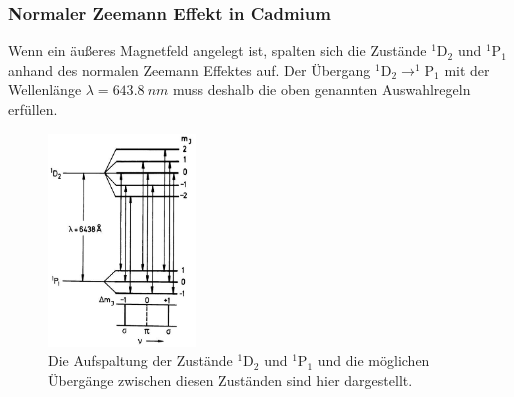         \subsubsection*{Normaler Zeemann Effekt in Cadmium}
            Wenn ein äußeres Magnetfeld angelegt ist, spalten sich die Zustände $^1\text{D}_2$ und $^1\text{P}_1$ anhand des normalen Zeemann Effektes auf.
            Der Übergang $^1\text{D}_2 \rightarrow ^1\text{P}_1$ mit der Wellenlänge $\lambda = \SI{643,8}{nm}$ muss deshalb die oben genannten Auswahlregeln erfüllen.
            \begin{figure}[h]
                \center
                \includegraphics[width=0.35\textwidth]{bilder/normalerZeemann.jpeg}
                \caption{Die Aufspaltung der Zustände $^1\text{D}_2$ und $^1\text{P}_1$ und die möglichen Übergänge zwischen diesen Zuständen sind hier dargestellt. \cite{haken_atom-_2004}}
                \label{fig:normalerZeemann}
            \end{figure}
            \FloatBarrier
            

